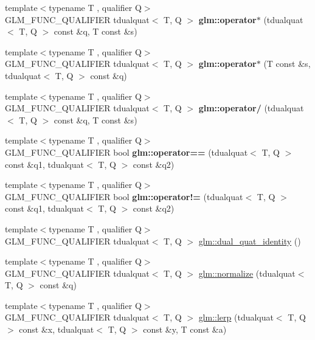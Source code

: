 \begin{DoxyCompactItemize}
\item 
{\footnotesize template$<$typename T , qualifier Q$>$ }\\G\+L\+M\+\_\+\+F\+U\+N\+C\+\_\+\+Q\+U\+A\+L\+I\+F\+I\+ER tdualquat$<$ T, Q $>$ {\bfseries glm\+::operator$\ast$} (tdualquat$<$ T, Q $>$ const \&q, T const \&s)
\item 
{\footnotesize template$<$typename T , qualifier Q$>$ }\\G\+L\+M\+\_\+\+F\+U\+N\+C\+\_\+\+Q\+U\+A\+L\+I\+F\+I\+ER tdualquat$<$ T, Q $>$ {\bfseries glm\+::operator$\ast$} (T const \&s, tdualquat$<$ T, Q $>$ const \&q)
\item 
{\footnotesize template$<$typename T , qualifier Q$>$ }\\G\+L\+M\+\_\+\+F\+U\+N\+C\+\_\+\+Q\+U\+A\+L\+I\+F\+I\+ER tdualquat$<$ T, Q $>$ {\bfseries glm\+::operator/} (tdualquat$<$ T, Q $>$ const \&q, T const \&s)
\item 
{\footnotesize template$<$typename T , qualifier Q$>$ }\\G\+L\+M\+\_\+\+F\+U\+N\+C\+\_\+\+Q\+U\+A\+L\+I\+F\+I\+ER bool {\bfseries glm\+::operator==} (tdualquat$<$ T, Q $>$ const \&q1, tdualquat$<$ T, Q $>$ const \&q2)
\item 
{\footnotesize template$<$typename T , qualifier Q$>$ }\\G\+L\+M\+\_\+\+F\+U\+N\+C\+\_\+\+Q\+U\+A\+L\+I\+F\+I\+ER bool {\bfseries glm\+::operator!=} (tdualquat$<$ T, Q $>$ const \&q1, tdualquat$<$ T, Q $>$ const \&q2)
\item 
{\footnotesize template$<$typename T , qualifier Q$>$ }\\G\+L\+M\+\_\+\+F\+U\+N\+C\+\_\+\+Q\+U\+A\+L\+I\+F\+I\+ER tdualquat$<$ T, Q $>$ \hyperlink{group__gtx__dual__quaternion_ga0b35c0e30df8a875dbaa751e0bd800e0}{glm\+::dual\+\_\+quat\+\_\+identity} ()
\item 
{\footnotesize template$<$typename T , qualifier Q$>$ }\\G\+L\+M\+\_\+\+F\+U\+N\+C\+\_\+\+Q\+U\+A\+L\+I\+F\+I\+ER tdualquat$<$ T, Q $>$ \hyperlink{group__gtx__dual__quaternion_ga299b8641509606b1958ffa104a162cfe}{glm\+::normalize} (tdualquat$<$ T, Q $>$ const \&q)
\item 
{\footnotesize template$<$typename T , qualifier Q$>$ }\\G\+L\+M\+\_\+\+F\+U\+N\+C\+\_\+\+Q\+U\+A\+L\+I\+F\+I\+ER tdualquat$<$ T, Q $>$ \hyperlink{group__gtx__dual__quaternion_gace8380112d16d33f520839cb35a4d173}{glm\+::lerp} (tdualquat$<$ T, Q $>$ const \&x, tdualquat$<$ T, Q $>$ const \&y, T const \&a)
\item 

\end{DoxyCompactItemize}
